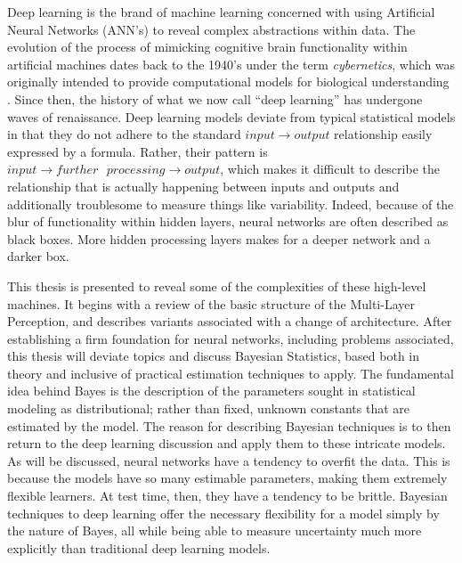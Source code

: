 Deep learning is the brand of machine learning concerned with using Artificial Neural Networks (ANN's) to reveal complex abstractions within data.
The evolution of the process of mimicking cognitive brain functionality within artificial machines dates back to the 1940's under the term \textit{cybernetics}, which was originally intended to provide computational models for biological understanding \cite{Goodfellow-et-al-2016}.  Since then, the history of what we now call ``deep learning'' has undergone waves of renaissance.
Deep learning models deviate from typical statistical models in that they do not adhere to the standard $input \rightarrow output$ relationship easily expressed by a formula.  Rather, their pattern is $input \rightarrow further \text{ } processing \rightarrow output$, which makes it difficult to describe the relationship that is actually happening between inputs and outputs and additionally troublesome to measure things like variability.
Indeed, because of the blur of functionality within hidden layers, neural networks are often described as black boxes.  More hidden processing layers makes for a deeper network and a darker box.

This thesis is presented to reveal some of the complexities of these high-level machines.  It begins with a review of the basic structure of the Multi-Layer Perception, and describes variants associated with a change of architecture. After establishing a firm foundation for neural networks, including problems associated, this thesis will deviate topics and discuss Bayesian Statistics, based both in theory and inclusive of practical estimation techniques to apply.  The fundamental idea behind Bayes is the description of the parameters sought in statistical modeling as distributional; rather than fixed, unknown constants that are estimated by the model.  The reason for describing Bayesian techniques is to then return to the deep learning discussion and apply them to these intricate models.  As will be discussed, neural networks have a tendency to overfit the data.  This is because the models have so many estimable parameters, making them extremely flexible learners.  At test time, then, they have a tendency to be brittle.  Bayesian techniques to deep learning offer the necessary flexibility for a model simply by the nature of Bayes, all while being able to measure uncertainty much more explicitly than traditional deep learning models.